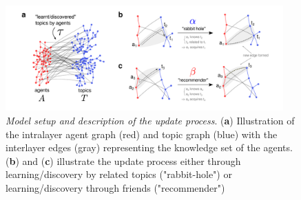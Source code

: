 \begin{figure}[H]
    \centering
    \includegraphics[width=0.95\textwidth,center]{../figures/report/Fig1.pdf}
    \caption{\label{fig:1}
    \textit{Model setup and description of the update process}.
    (\textbf{a}) Illustration of the intralayer agent graph (red) and topic graph (blue) with the interlayer edges (gray) representing the knowledge set of the agents.
    (\textbf{b}) and (\textbf{c}) illustrate the update process either through learning/discovery by related topics ("rabbit-hole") or learning/discovery through friends ("recommender")
    }
\end{figure}
